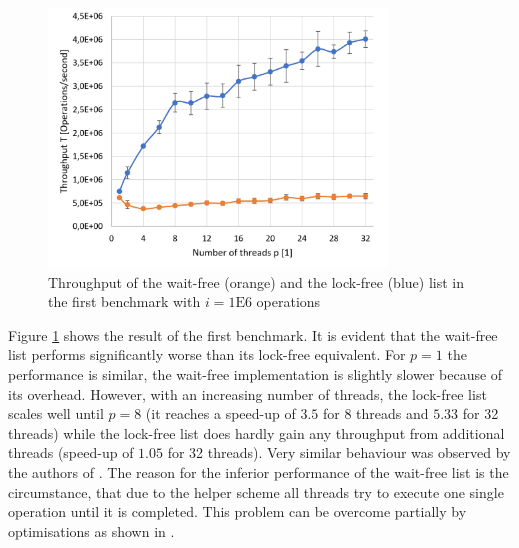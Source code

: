 \documentclass[a4paper, 12pt]{article}
\begin{document}
\begin{figure} [h!]
\includegraphics[width=9cm]{tp_vs_p.png}
\centering
\caption{Throughput of the wait-free (orange) and the lock-free (blue) list in the first benchmark with $i = 1\mathrm{E}6$ operations}
\label{tp_p}
\end{figure}

Figure \ref{tp_p} shows the result of the first benchmark. It is evident that the wait-free list performs significantly worse than its lock-free equivalent. For $p=1$ the performance is similar, the wait-free implementation is slightly slower because of its overhead. However, with  an increasing number of threads, the lock-free list scales well until $p=8$ (it reaches a speed-up of $3.5$ for 8 threads and $5.33$ for 32 threads) while the lock-free list does hardly gain any throughput from additional threads (speed-up of $1.05$ for 32 threads). Very similar behaviour was observed by the authors of \cite{timnat12}. The reason for the inferior performance of the wait-free list is the circumstance, that due to the helper scheme all threads try to execute one single operation until it is completed. This problem can be overcome partially by optimisations as shown in \cite{timnat12}.
\end{document}
